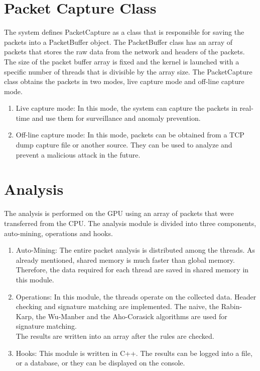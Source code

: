 \section{Packet Capture Class}
The system defines PacketCapture as a class that is responsible for saving the packets into a PacketBuffer object. The PacketBuffer class has an array of packets that stores the raw data from the network and headers of the packets. The size of the packet buffer array is fixed and the kernel is launched with a specific number of threads that is divisible by the array size.
The PacketCapture class obtains the packets in two modes, live capture mode and off-line capture mode. 

\begin{enumerate}[leftmargin=*]
	\item Live capture mode: In this mode, the system can capture the packets in real-time and use them for surveillance and anomaly prevention.
	\item Off-line capture mode: In this mode, packets can be obtained from a TCP dump capture file or another source. They can be used to analyze and prevent a malicious attack in the future.
\end{enumerate}
\vspace{\topsep}

\section{Analysis}
The analysis is performed on the GPU using an array of packets that were transferred from the CPU. The analysis module is divided into three components, auto-mining, operations and hooks.
\begin{enumerate}[leftmargin=*]
	\item Auto-Mining: The entire packet analysis is distributed among the threads. As already mentioned, shared memory is much faster than global memory. Therefore, the data required for each thread are saved in shared memory in this module.
	\item Operations: In this module, the threads operate on the collected data. Header checking and signature matching are implemented. The naive, the Rabin-Karp, the Wu-Manber and the Aho-Corasick algorithms are used for signature matching. \\
	The results are written into an array after the rules are checked.
	\item Hooks: This module is written in C++. The results can be logged into a file, or a database, or they can be displayed on the console.
\end{enumerate}